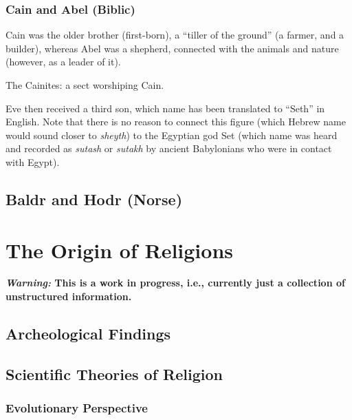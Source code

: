 \documentclass[
]{book}
\begin{document}
\hypertarget{cain-and-abel-biblic}{%
\subsection{Cain and Abel (Biblic)}\label{cain-and-abel-biblic}}

Cain was the older brother (first-born), a ``tiller of the ground'' (a farmer, and a builder), whereas Abel was a shepherd, connected with the animals and nature (however, as a leader of it).

The Cainites: a sect worshiping Cain.

Eve then received a third son, which name has been translated to ``Seth'' in English. Note that there is no reason to connect this figure (which Hebrew name would sound closer to \emph{sheyth}) to the Egyptian god Set (which name was heard and recorded as \emph{sutash} or \emph{sutakh} by ancient Babylonians who were in contact with Egypt).

\hypertarget{baldr-and-hodr-norse}{%
\section{Baldr and Hodr (Norse)}\label{baldr-and-hodr-norse}}

\hypertarget{the-origin-of-religions}{%
\chapter{The Origin of Religions}\label{the-origin-of-religions}}

\textbf{\emph{Warning:} This is a work in progress, i.e., currently just a collection of unstructured information.}

\hypertarget{archeological-findings}{%
\section{Archeological Findings}\label{archeological-findings}}

\hypertarget{scientific-theories-of-religion}{%
\section{Scientific Theories of Religion}\label{scientific-theories-of-religion}}

\hypertarget{evolutionary-perspective}{%
\subsection{Evolutionary Perspective}\label{evolutionary-perspective}}
\end{document}
